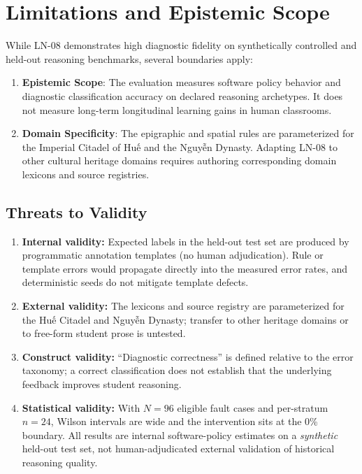 \documentclass[11pt,a4paper]{article}
\begin{document}
\section{Limitations and Epistemic Scope}
While LN-08 demonstrates high diagnostic fidelity on synthetically controlled and held-out reasoning benchmarks, several boundaries apply:
\begin{enumerate}[leftmargin=*]
    \item \textbf{Epistemic Scope}: The evaluation measures software policy behavior and diagnostic classification accuracy on declared reasoning archetypes. It does not measure long-term longitudinal learning gains in human classrooms.
    \item \textbf{Domain Specificity}: The epigraphic and spatial rules are parameterized for the Imperial Citadel of Huế and the Nguyễn Dynasty. Adapting LN-08 to other cultural heritage domains requires authoring corresponding domain lexicons and source registries.
\end{enumerate}

\subsection{Threats to Validity}

\begin{enumerate}[leftmargin=*]
    \item \textbf{Internal validity:} Expected labels in the held-out test set are produced by programmatic annotation templates (no human adjudication). Rule or template errors would propagate directly into the measured error rates, and deterministic seeds do not mitigate template defects.
    \item \textbf{External validity:} The lexicons and source registry are parameterized for the Huế Citadel and Nguyễn Dynasty; transfer to other heritage domains or to free-form student prose is untested.
    \item \textbf{Construct validity:} ``Diagnostic correctness'' is defined relative to the error taxonomy; a correct classification does not establish that the underlying feedback improves student reasoning.
    \item \textbf{Statistical validity:} With $N=96$ eligible fault cases and per-stratum $n=24$, Wilson intervals are wide and the intervention sits at the 0\% boundary. All results are internal software-policy estimates on a \emph{synthetic} held-out test set, not human-adjudicated external validation of historical reasoning quality.
\end{enumerate}
\end{document}
